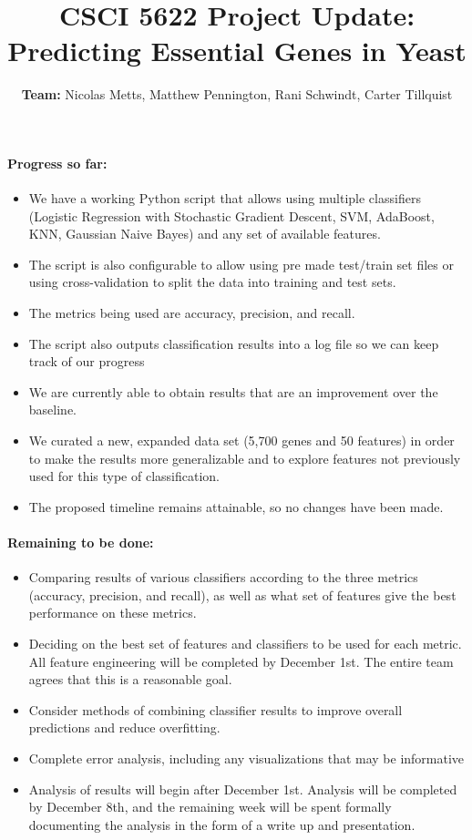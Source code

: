 \documentclass[11pt, oneside]{article}   	%
\title{CSCI 5622 Project Update: Predicting Essential Genes in Yeast}
\author{\textbf{Team:} Nicolas Metts, Matthew Pennington, Rani Schwindt, Carter Tillquist}
\date{}							%
\begin{document}
\maketitle

\paragraph{Progress so far:}
\begin{itemize}
\item  We have a working Python script that allows using multiple classifiers (Logistic Regression with Stochastic Gradient Descent, SVM, AdaBoost, KNN, Gaussian Naive Bayes) and any set of available features.
\item The script is also configurable to allow using pre made test/train set files or using cross-validation to split the data into training and test sets.
\item The metrics being used are accuracy, precision, and recall.
\item The script also outputs classification results into a log file so we can keep track of our progress
\item We are currently able to obtain results that are an improvement over the baseline.
\item We curated a new, expanded data set (5,700 genes and 50 features) in order to make the results more generalizable and to explore features not previously used for this type of classification.
\item The proposed timeline remains attainable, so no changes have been made.
\end{itemize}
\paragraph{Remaining to be done:}
\begin{itemize}
\item Comparing results of various classifiers according to the three metrics (accuracy, precision, and recall), as well as what set of features give the best performance on these metrics.
\item Deciding on the best set of features and classifiers to be used for each metric. All feature engineering will be completed by December 1st. The entire team agrees that this is a reasonable goal.
\item Consider methods of combining classifier results to improve overall predictions and reduce overfitting.
\item Complete error analysis, including any visualizations that may be informative 
\item Analysis of results will begin after December 1st. Analysis will be completed by December 8th, and the remaining week will be spent formally documenting the analysis in the form of a write up and presentation.
\end{itemize}
\end{document}
